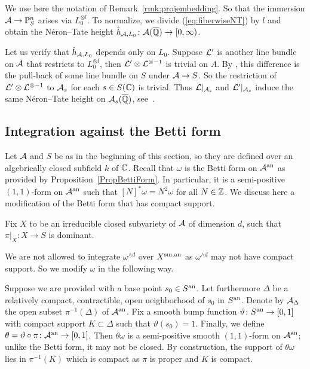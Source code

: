 \begin{remark}\label{RemarkHtcompatible}
  We use here the notation of Remark~\ref{rmk:projembedding}.
  So that the immersion $\mathcal{A}\rightarrow {\mathbb{P}}^n_S$ arises via
  $L_0^{\otimes l}$. To normalize,
  we divide (\ref{eq:fiberwiseNT}) by $l$ and obtain the 
  N\'eron--Tate height $\hat h_{\mathcal{A},L_0}\colon \mathcal{A}({\overline{\mathbb{Q}}})\rightarrow
  [0,\infty)$.

  Let us verify that $\hat h_{\mathcal{A},L_0}$ depends only on $L_0$. Suppose
  ${\mathcal L}'$ is another line bundle on $\mathcal{A}$ that restricts to
  $L_0^{\otimes l}$,
  then ${\mathcal L}'\otimes{\mathcal L}^{\otimes -1}$ is trivial on $A$. By \cite[Corollaire~21.4.13 (pp.~361 of EGA IV-4, in Errata et Addenda, liste~3)]{EGAIV}, this difference is the pull-back of some line
  bundle on $S$ under $\mathcal{A}\rightarrow S$. So the restriction of
  ${\mathcal L}'\otimes{\mathcal L}^{\otimes -1}$ to $\mathcal{A}_s$ for each $s\in S({\mathbb{C}})$ is
  trivial. Thus ${\mathcal L}|_{\mathcal{A}_s}$ and ${\mathcal L}'|_{\mathcal{A}_s}$ induce the same N\'eron--Tate
  height on $\mathcal{A}_s({\overline{\mathbb{Q}}})$, see~\cite[$\mathsection$9.2]{BG}. 
\end{remark}

\subsection{Integration against the Betti form}\label{SubsectionSetUpHtIneqBetti}
Let $\mathcal{A}$  and $S$ be as in the beginning of this section, so they are
defined over an algebrically closed subfield $k$ of ${\mathbb{C}}$. 
Recall that $\omega$ is the Betti form on ${\mathcal{A}}^{\mathrm{an}}$ as provided by
Proposition~\ref{PropBettiForm}. In particular, it is a
semi-positive $(1,1)$-form on ${\mathcal{A}}^{\mathrm{an}}$ such that $[N]^*\omega =
N^2 \omega$ for all $N\in{\mathbb{Z}}$. We discuss here a modification of  the
Betti form that has compact support.

Fix $X$ to be an irreducible closed subvariety of $\mathcal{A}$ of dimension $d$, such that $\pi|_X \colon X \rightarrow S$ is dominant. 

We are not allowed to integrate $\omega^{\wedge d}$ over ${X}^{\mathrm{sm,an}}$ as $\omega^{\wedge d}$ may not have compact support. So we modify $\omega$ in the following way.

Suppose we are provided with a base point $s_0 \in {S}^{\mathrm{an}}$. Let
furthermore $\Delta$ be a relatively compact, contractible,
open neighborhood of $s_0$ in ${S}^{\mathrm{an}}$. Denote by $\mathcal{A}_{\Delta}$ the open
subset $\pi^{-1}(\Delta)$ of ${\mathcal{A}}^{\mathrm{an}}$. Fix a smooth bump function $\vartheta \colon {S}^{\mathrm{an}}\rightarrow [0,1]$ with compact support $K \subset \Delta$ such that $\vartheta(s_0)=1$. Finally, we define $\theta = \vartheta\circ\pi \colon {\mathcal{A}}^{\mathrm{an}} \rightarrow [0,1]$.
Then $\theta\omega$ is a semi-positive smooth $(1,1)$-form on ${\mathcal{A}}^{\mathrm{an}}$;
unlike the Betti form, it may not be closed. By construction, the support
of $\theta\omega$ lies in $\pi^{-1}(K)$ which is compact as $\pi$ is proper and $K$ is compact. 

